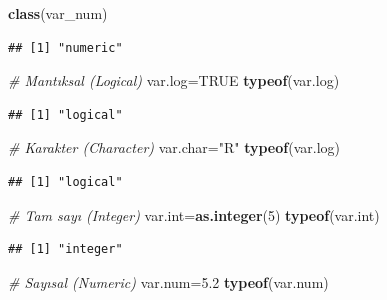 \documentclass[
]{book}
\newenvironment{Shaded}{\begin{snugshade}}{\end{snugshade}}
\newcommand{\CommentTok}[1]{\textcolor[rgb]{0.56,0.35,0.01}{\textit{#1}}}
\newcommand{\ConstantTok}[1]{\textcolor[rgb]{0.56,0.35,0.01}{#1}}
\newcommand{\DecValTok}[1]{\textcolor[rgb]{0.00,0.00,0.81}{#1}}
\newcommand{\FloatTok}[1]{\textcolor[rgb]{0.00,0.00,0.81}{#1}}
\newcommand{\FunctionTok}[1]{\textcolor[rgb]{0.13,0.29,0.53}{\textbf{#1}}}
\newcommand{\NormalTok}[1]{#1}
\newcommand{\OtherTok}[1]{\textcolor[rgb]{0.56,0.35,0.01}{#1}}
\newcommand{\StringTok}[1]{\textcolor[rgb]{0.31,0.60,0.02}{#1}}
\begin{document}
\begin{Shaded}
\begin{Highlighting}[]
\FunctionTok{class}\NormalTok{(var\_num)}
\end{Highlighting}
\end{Shaded}

\begin{verbatim}
## [1] "numeric"
\end{verbatim}

\begin{Shaded}
\begin{Highlighting}[]
\CommentTok{\# Mantıksal (Logical)}
\NormalTok{var.log}\OtherTok{=}\ConstantTok{TRUE}
\FunctionTok{typeof}\NormalTok{(var.log)}
\end{Highlighting}
\end{Shaded}

\begin{verbatim}
## [1] "logical"
\end{verbatim}

\begin{Shaded}
\begin{Highlighting}[]
\CommentTok{\# Karakter (Character)}
\NormalTok{var.char}\OtherTok{=}\StringTok{"R"}
\FunctionTok{typeof}\NormalTok{(var.log)}
\end{Highlighting}
\end{Shaded}

\begin{verbatim}
## [1] "logical"
\end{verbatim}

\begin{Shaded}
\begin{Highlighting}[]
\CommentTok{\# Tam sayı (Integer)}
\NormalTok{var.int}\OtherTok{=}\FunctionTok{as.integer}\NormalTok{(}\DecValTok{5}\NormalTok{)}
\FunctionTok{typeof}\NormalTok{(var.int)}
\end{Highlighting}
\end{Shaded}

\begin{verbatim}
## [1] "integer"
\end{verbatim}

\begin{Shaded}
\begin{Highlighting}[]
\CommentTok{\# Sayısal (Numeric)}
\NormalTok{var.num}\OtherTok{=}\FloatTok{5.2}
\FunctionTok{typeof}\NormalTok{(var.num)}
\end{Highlighting}
\end{Shaded}
\end{document}

